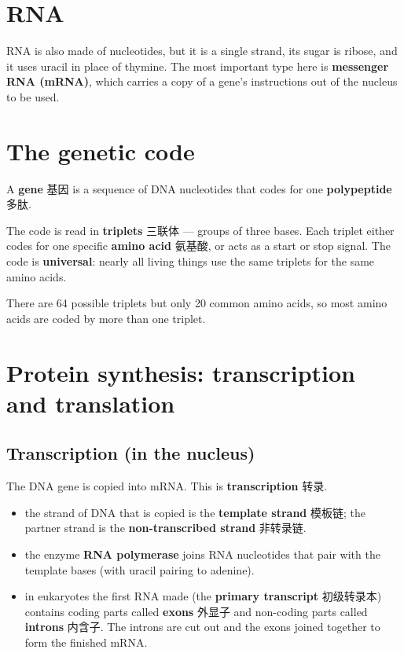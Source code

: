 \documentclass[11pt]{article}
\begin{document}
\section*{RNA}

RNA is also made of nucleotides, but it is a single strand, its sugar is ribose, and it uses uracil in place of thymine. The most important type here is \textbf{messenger RNA (mRNA)}, which carries a copy of a gene's instructions out of the nucleus to be used.

\section*{The genetic code}

A \textbf{gene} 基因 is a sequence of DNA nucleotides that codes for one \textbf{polypeptide} 多肽.

The code is read in \textbf{triplets} 三联体 — groups of three bases. Each triplet either codes for one specific \textbf{amino acid} 氨基酸, or acts as a start or stop signal. The code is \textbf{universal}: nearly all living things use the same triplets for the same amino acids.

There are 64 possible triplets but only 20 common amino acids, so most amino acids are coded by more than one triplet.

\section*{Protein synthesis: transcription and translation}

\subsection*{Transcription (in the nucleus)}

The DNA gene is copied into mRNA. This is \textbf{transcription} 转录.

\begin{itemize}
\item the strand of DNA that is copied is the \textbf{template strand} 模板链; the partner strand is the \textbf{non-transcribed strand} 非转录链.

\item the enzyme \textbf{RNA polymerase} joins RNA nucleotides that pair with the template bases (with uracil pairing to adenine).

\item in eukaryotes the first RNA made (the \textbf{primary transcript} 初级转录本) contains coding parts called \textbf{exons} 外显子 and non-coding parts called \textbf{introns} 内含子. The introns are cut out and the exons joined together to form the finished mRNA.

\end{itemize}
\end{document}
